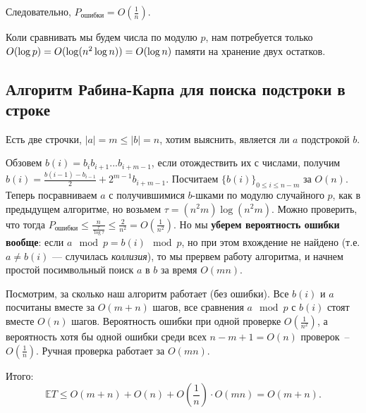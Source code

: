Следовательно, $P_\text{ошибки} = O\left(\frac{1}{n}\right)$.

Коли сравнивать мы будем числа по модулю $p$, нам потребуется только $O(\log p) = \\ O(\log(n^2\log n)) = O(\log n)$ памяти на хранение двух остатков.

\subsection{Алгоритм Рабина-Карпа для поиска подстроки в строке}

Есть две строчки, $|a|=m\le|b|=n$, хотим выяснить, является ли $a$ подстрокой $b$.

Обзовем $b(i)=b_i b_{i+1}...b_{i+m-1}$, если отождествить их с числами, получим $b(i)=\frac{b(i-1)-b_{i-1}}{2}+2^{m-1} b_{i+m-1}$. Посчитаем $\{b(i)\}_{0\le i\le n-m}$ за $O(n)$. Теперь посравниваем $a$ с получившимися $b$-шками по модулю случайного $p$, как в предыдущем алгоритме, но возьмем $\tau=(n^2m)\log(n^2m)$. Можно проверить, что тогда $P_{\text{ошибки}}\le\frac{n}{\frac{\tau}{\log\tau}}\le\frac{2}{n^2}=O(\frac{1}{n^2})$. Но мы \textbf{уберем вероятность ошибки вообще}: если $a\mod{p}=b(i)\mod{p}$, но при этом вхождение не найдено (т.е. $a\neq b(i)$ --- случилась \emph{коллизия}), то мы прервем работу алгоритма, и начнем простой посимвольный поиск $a$ в $b$ за время $O(mn)$.

Посмотрим, за сколько наш алгоритм работает (без ошибки). Все $b(i)$ и $a$ посчитаны вместе за $O(m+n)$ шагов, все сравнения $a \mod{p}$ с $b(i)$ стоят вместе $O(n)$ шагов. Вероятность ошибки при одной проверке $O\left(\frac{1}{n^2}\right)$, а вероятность хотя бы одной ошибки среди всех $n-m+1 = O(n)$ проверок~-- $O\left(\frac{1}{n}\right)$. Ручная проверка работает за $O(mn)$.

Итого: $$\mathbb E T\le O(m+n) + O(n) + O\left(\frac{1}{n}\right)\cdot O(mn) = O(m+n).$$
